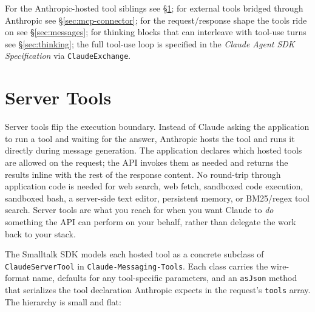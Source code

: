 \documentclass[a4paper,10pt,fleqn]{article}
\newcommand{\pkg}[1]{\texttt{#1}}
\begin{document}
For the Anthropic-hosted tool siblings see \S\ref{sec:server-tools};
for external tools bridged through Anthropic see
\S\ref{sec:mcp-connector}; for the request/response shape the tools
ride on see \S\ref{sec:messages}; for thinking blocks that can
interleave with tool-use turns see \S\ref{sec:thinking}; the full
tool-use loop is specified in the \emph{Claude Agent SDK
Specification} via \texttt{ClaudeExchange}.

\medskip
\begin{sloppypar}
\end{sloppypar}

\section{Server Tools}
\label{sec:server-tools}

Server tools flip the execution boundary.  Instead of Claude
asking the application to run a tool and waiting for the answer,
Anthropic hosts the tool and runs it directly during message
generation.  The application declares which hosted tools are
allowed on the request; the API invokes them as needed and returns
the results inline with the rest of the response content.  No
round-trip through application code is needed for web search, web
fetch, sandboxed code execution, sandboxed bash, a server-side
text editor, persistent memory, or BM25/regex tool search.
Server tools are what you reach for when you want Claude to
\emph{do} something the API can perform on your behalf, rather
than delegate the work back to your stack.

\begin{sloppypar}
The Smalltalk SDK models each hosted tool as a concrete subclass
of \texttt{ClaudeServerTool} in \pkg{Claude-Messaging-Tools}.
Each class carries the wire-format name, defaults for any
tool-specific parameters, and an \texttt{asJson} method that
serializes the tool declaration Anthropic expects in the request's
\texttt{tools} array.  The hierarchy is small and flat:
\end{sloppypar}
\end{document}
